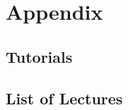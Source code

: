 \documentclass[a4paper, 10pt, oneside]{book}
\begin{document}
\chapter*{Appendix}
\section*{Tutorials}

\section*{List of Lectures}
\begin{itemize}
    \renewcommand*{\do}[1]{\item \hyperlink{#1}{Lecture \StrBehind{#1}{c}}}
    \dolistloop{\lecturelist}
\end{itemize}
\end{document}
